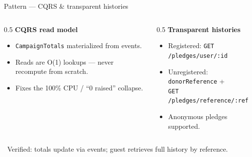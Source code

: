 \documentclass[aspectratio=169]{beamer}
\newcommand{\good}{\textcolor{brandgreen}{\textbf{\checkmark}}}
\begin{document}
\begin{frame}{Pattern --- CQRS \& transparent histories}
  \begin{columns}[T]
    \begin{column}{0.5\textwidth}
      \textbf{CQRS read model}
      \begin{itemize}\scriptsize
        \item \texttt{CampaignTotals} materialized from events.
        \item Reads are O(1) lookups --- never recompute from scratch.
        \item Fixes the 100\% CPU / ``0 raised'' collapse.
      \end{itemize}
    \end{column}
    \begin{column}{0.5\textwidth}
      \textbf{Transparent histories}
      \begin{itemize}\scriptsize
        \item Registered: \texttt{GET /pledges/user/:id}
        \item Unregistered: \texttt{donorReference} +\\ \texttt{GET /pledges/reference/:ref}
        \item Anonymous pledges supported.
      \end{itemize}
    \end{column}
  \end{columns}
  \vspace{0.4em}
  \begin{center}\scriptsize\good\ Verified: totals update via events; guest retrieves full history by reference.\end{center}
\end{frame}
\end{document}
